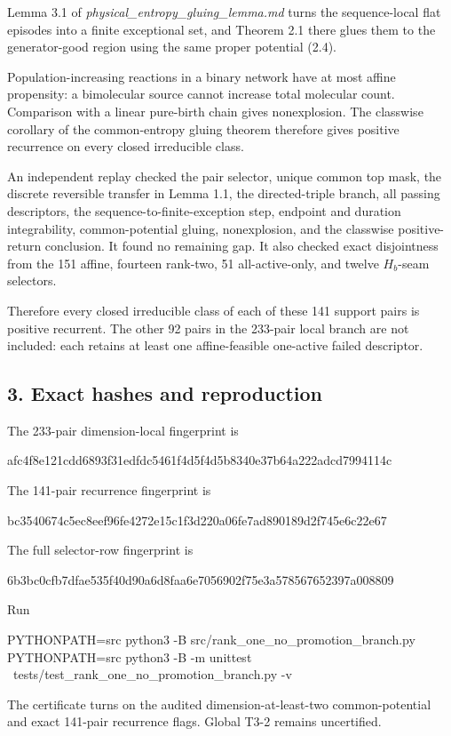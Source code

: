 Lemma 3.1 of \emph{physical\_entropy\_gluing\_lemma.md} turns the
sequence-local flat episodes into a finite exceptional set, and Theorem
2.1 there glues them to the generator-good region using the same proper
potential (2.4).

Population-increasing reactions in a binary network have at most affine
propensity: a bimolecular source cannot increase total molecular count.
Comparison with a linear pure-birth chain gives nonexplosion. The
classwise corollary of the common-entropy gluing theorem therefore gives
positive recurrence on every closed irreducible class.

An independent replay checked the pair selector, unique common top mask,
the discrete reversible transfer in Lemma 1.1, the directed-triple
branch, all passing descriptors, the sequence-to-finite-exception step,
endpoint and duration integrability, common-potential gluing,
nonexplosion, and the classwise positive-return conclusion. It found no
remaining gap. It also checked exact disjointness from the 151 affine,
fourteen rank-two, 51 all-active-only, and twelve \(H_b\)-seam
selectors.

Therefore every closed irreducible class of each of these 141 support
pairs is positive recurrent. The other 92 pairs in the 233-pair local
branch are not included: each retains at least one affine-feasible
one-active failed descriptor.

\subsection{3. Exact hashes and
reproduction}

The 233-pair dimension-local fingerprint is

\begin{CodeBlock}
afc4f8e121cdd6893f31edfdc5461f4d5f4d5b8340e37b64a222adcd7994114c
\end{CodeBlock}

The 141-pair recurrence fingerprint is

\begin{CodeBlock}
bc3540674c5ec8eef96fe4272e15c1f3d220a06fe7ad890189d2f745e6c22e67
\end{CodeBlock}

The full selector-row fingerprint is

\begin{CodeBlock}
6b3bc0cfb7dfae535f40d90a6d8faa6e7056902f75e3a578567652397a008809
\end{CodeBlock}

Run

\begin{CodeBlock}
PYTHONPATH=src python3 -B src/rank_one_no_promotion_branch.py
PYTHONPATH=src python3 -B -m unittest \
  tests/test_rank_one_no_promotion_branch.py -v
\end{CodeBlock}

The certificate turns on the audited dimension-at-least-two
common-potential and exact 141-pair recurrence flags. Global T3-2
remains uncertified.
